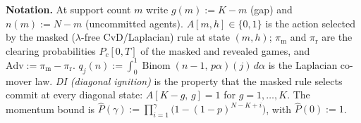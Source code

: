 
\noindent\textbf{Notation.} At support count $m$ write $g(m) := K - m$ (gap) and $n(m) := N - m$ (uncommitted agents). $A[m,h] \in \{0,1\}$ is the action selected by the masked ($\lambda$-free CvD/Laplacian) rule at state $(m,h)$; $\pi_{\mathrm{m}}$ and $\pi_{\mathrm{r}}$ are the clearing probabilities $P_c[0,T]$ of the masked and revealed games, and $\mathrm{Adv} := \pi_{\mathrm{m}} - \pi_{\mathrm{r}}$. $q_j(n) := \int_0^1 \operatorname{Binom}(n-1,\, p\alpha)(j)\, d\alpha$ is the Laplacian co-mover law. \emph{DI (diagonal ignition)} is the property that the masked rule selects commit at every diagonal state: $A[K-g,\, g] = 1$ for $g = 1, \dots, K$. The momentum bound is $\widehat P(\gamma) := \prod_{i=1}^{\gamma} \bigl( 1 - (1-p)^{N-K+i} \bigr)$, with $\widehat P(0) := 1$.

